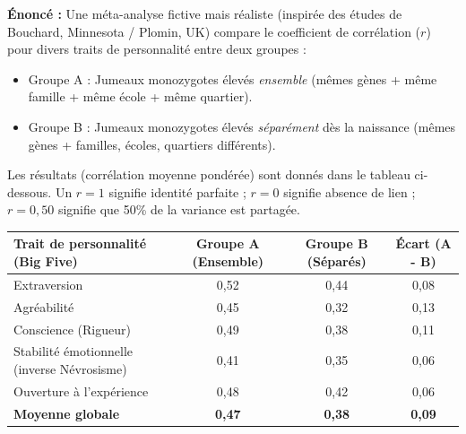 \documentclass[11pt]{article}
\begin{document}
\begin{exoresolu}
\textbf{Énoncé :} Une méta-analyse fictive mais réaliste (inspirée des études de Bouchard, Minnesota / Plomin, UK) compare le coefficient de corrélation ($r$) pour divers traits de personnalité entre deux groupes :
\begin{itemize}
    \item Groupe A : Jumeaux monozygotes élevés \emph{ensemble} (mêmes gènes + même famille + même école + même quartier).
    \item Groupe B : Jumeaux monozygotes élevés \emph{séparément} dès la naissance (mêmes gènes + familles, écoles, quartiers différents).
\end{itemize}
Les résultats (corrélation moyenne pondérée) sont donnés dans le tableau ci-dessous. Un $r = 1$ signifie identité parfaite ; $r = 0$ signifie absence de lien ; $r = 0,50$ signifie que 50\% de la variance est partagée.

\begin{center}
\begin{tabular}{|l|c|c|c|}\hline
\textbf{Trait de personnalité (Big Five)} & \textbf{Groupe A (Ensemble)} & \textbf{Groupe B (Séparés)} & \textbf{Écart (A - B)} \\ \hline
Extraversion & 0,52 & 0,44 & 0,08 \\ \hline
Agréabilité & 0,45 & 0,32 & 0,13 \\ \hline
Conscience (Rigueur) & 0,49 & 0,38 & 0,11 \\ \hline
Stabilité émotionnelle (inverse Névrosisme) & 0,41 & 0,35 & 0,06 \\ \hline
Ouverture à l'expérience & 0,48 & 0,42 & 0,06 \\ \hline
\textbf{Moyenne globale} & \textbf{0,47} & \textbf{0,38} & \textbf{0,09} \\ \hline
\end{tabular}
\end{center}


\end{exoresolu}
\end{document}
